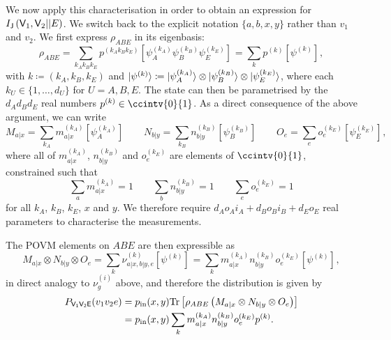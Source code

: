 \documentclass[10pt, a4paper]{article}
\numberwithin{equation}{section} %
\theoremstyle{definition}
\theoremstyle{plain}
\newcommand{\dintv}[2]{\mathopen\{#1,\ldots,#2\mathclose\}}
\newcommand{\?}{\mathrel{?}} %
\newcommand{\Tr}{\mathrm{Tr}} %
\newcommand{\crv}[1]{\mathsf{#1}}
\newcommand{\proj}[2][]{{[#2]}_{#1}}
\begin{document}
    We now apply this characterisation in order to obtain an expression for \(\splitkey{\crv{V}_1, \crv{V}_2}{E}\). We switch back to the explicit notation \(\{a, b, x, y\}\) rather than \(v_1\) and \(v_2\). We first express \(\rho_{ABE}\) in its eigenbasis:
    \begin{equation}
      \rho_{ABE} = \sum_{k_A k_B k_E} p^{(k_A k_B k_E)} \proj{\psi_A^{(k_A)} \psi_B^{(k_B)} \psi_E^{(k_E)}} = \sum_{k} p^{(k)} \proj{\psi^{(k)}},
    \end{equation}
    with \(k \coloneqq (k_A, k_B, k_E)\) and \(\ket{\psi^{(k)}} \coloneqq \ket{\psi_A^{(k_A)}} \otimes \ket{\psi_B^{(k_B)}} \otimes \ket{\psi_E^{(k_E)}}\), where each \(k_U \in \dintv{1}{d_U}\) for \(U = A,B,E\). The state can then be parametrised by the \(d_A d_B d_E\) real numbers \(p^{(k)} \in \ccintv{0}{1}\). As a direct consequence of the above argument, we can write
    \begin{equation}
      M_{a|x} = \sum_{k_A} m_{a|x}^{(k_A)} \proj{\psi_A^{(k_A)}} \qquad N_{b|y} = \sum_{k_B} n_{b|y}^{(k_B)} \proj{\psi_B^{(k_B)}} \qquad O_{e} = \sum_{e} o_{e}^{(k_E)} \proj{\psi_E^{(k_E)}},
    \end{equation}
    where all of \(m_{a|x}^{(k_A)}\), \(n_{b|y}^{(k_B)}\) and \(o_{e}^{(k_E)}\) are elements of \(\ccintv{0}{1}\), constrained such that
    \begin{equation}
      \sum_{a} m_{a|x}^{(k_A)} = 1 \qquad \sum_{b} n_{b|y}^{(k_B)} = 1 \qquad \sum_{e} o_e^{(k_E)} = 1
    \end{equation}
    for all \(k_A\), \(k_B\), \(k_E\), \(x\) and \(y\). We therefore require \(d_A o_A i_A + d_B o_B i_B + d_E o_E\) real parameters to characterise the measurements.

    The POVM elements on \(ABE\) are then expressible as
    \begin{equation}
      M_{a|x} \otimes N_{b|y} \otimes O_e = \sum_k \nu^{(k)}_{a|x,b|y,e} \proj{\psi^{(k)}} = \sum_k m_{a|x}^{(k_A)} n_{b|y}^{(k_B)} o_e^{(k_E)} \proj{\psi^{(k)}},
    \end{equation}
    in direct analogy to \(\nu_{g}^{(i)}\) above, and therefore the distribution is given by
    \begin{align}
      P_{\crv{V_1V_2E}}(v_1v_2e) &= p_{\rm in}(x,y) \Tr\left[\rho_{ABE} \left(M_{a|x} \otimes N_{b|y} \otimes O_e\right)\right] \\
                                 &= p_{\rm in}(x,y) \sum_k m_{a|x}^{(k_A)} n_{b|y}^{(k_B)} o_e^{(k_E)} p^{(k)}.
    \end{align}
\end{document}
